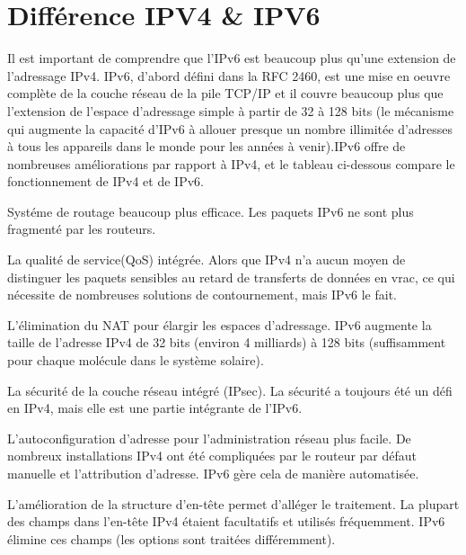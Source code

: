 \section{Différence IPV4 & IPV6}


Il est important de comprendre que l'IPv6 est beaucoup plus qu'une extension de l'adressage IPv4. IPv6, d'abord défini dans la RFC 2460, est une mise en oeuvre complète de la couche réseau de la pile TCP/IP et il couvre beaucoup plus que l'extension de l'espace d'adressage simple à partir de 32 à 128 bits (le mécanisme qui augmente la capacité d'IPv6 à allouer presque un nombre illimitée d'adresses à tous les appareils dans le monde pour les années à venir).IPv6 offre de nombreuses améliorations par rapport à IPv4, et le tableau ci-dessous compare le fonctionnement de IPv4 et de IPv6.


	Systéme de routage beaucoup plus efficace. Les paquets IPv6 ne sont plus fragmenté par les routeurs.
	
	La qualité de service(QoS) intégrée. Alors que IPv4 n'a aucun moyen de distinguer les paquets sensibles au retard de transferts de données en vrac, ce qui nécessite de nombreuses solutions de contournement, mais IPv6 le fait.
	
	L'élimination du NAT pour élargir les espaces d'adressage. IPv6 augmente la taille de l'adresse IPv4 de 32 bits (environ 4 milliards) à 128 bits (suffisamment pour chaque molécule dans le système solaire).
	
	La sécurité de la couche réseau intégré (IPsec). La sécurité a toujours été un défi en IPv4, mais elle est une partie intégrante de l'IPv6.
	
	L'autoconfiguration d'adresse pour l'administration réseau plus facile. De nombreux installations IPv4 ont été compliquées par le routeur par défaut manuelle et l'attribution d'adresse. IPv6 gère cela de manière automatisée.
	
	L'amélioration de la structure d'en-tête permet d'alléger le traitement. La plupart des champs dans l'en-tête IPv4 étaient facultatifs et utilisés fréquemment. IPv6 élimine ces champs (les options sont traitées différemment).


